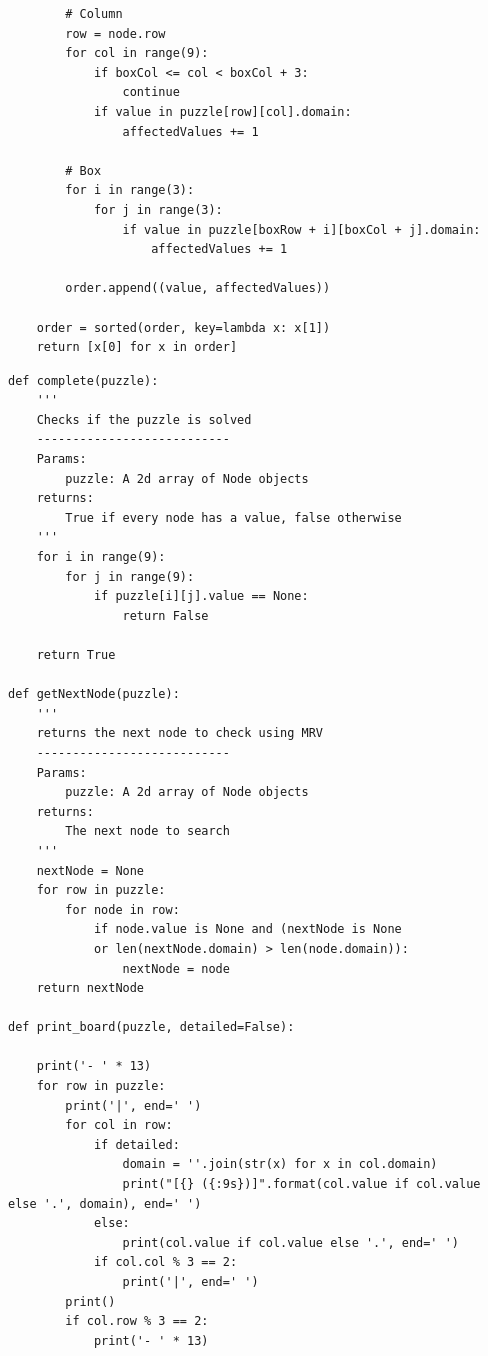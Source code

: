 \documentclass{article}
\begin{document}
\begin{verbatim}
        # Column
        row = node.row
        for col in range(9):
            if boxCol <= col < boxCol + 3:
                continue
            if value in puzzle[row][col].domain:
                affectedValues += 1
        
        # Box
        for i in range(3):
            for j in range(3):
                if value in puzzle[boxRow + i][boxCol + j].domain:
                    affectedValues += 1

        order.append((value, affectedValues))
        
    order = sorted(order, key=lambda x: x[1])
    return [x[0] for x in order]

\end{verbatim}
\newpage
\begin{verbatim}
def complete(puzzle):
    '''
    Checks if the puzzle is solved
    ---------------------------
    Params:
        puzzle: A 2d array of Node objects
    returns:
        True if every node has a value, false otherwise
    '''
    for i in range(9):
        for j in range(9):
            if puzzle[i][j].value == None:
                return False

    return True

def getNextNode(puzzle):
    '''
    returns the next node to check using MRV
    ---------------------------
    Params:
        puzzle: A 2d array of Node objects
    returns:
        The next node to search
    '''
    nextNode = None
    for row in puzzle:
        for node in row:
            if node.value is None and (nextNode is None 
            or len(nextNode.domain) > len(node.domain)):
                nextNode = node
    return nextNode

def print_board(puzzle, detailed=False):

    print('- ' * 13)
    for row in puzzle:
        print('|', end=' ')
        for col in row:
            if detailed:
                domain = ''.join(str(x) for x in col.domain)
                print("[{} ({:9s})]".format(col.value if col.value else '.', domain), end=' ')
            else:
                print(col.value if col.value else '.', end=' ')
            if col.col % 3 == 2:
                print('|', end=' ')
        print()
        if col.row % 3 == 2:
            print('- ' * 13)
\end{verbatim}
\newpage
\end{document}

